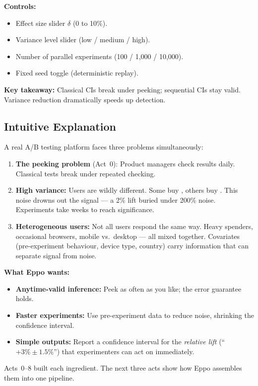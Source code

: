 \documentclass[12pt, a4paper]{article}
\begin{document}
\begin{simulation}
\textbf{Controls:}
\begin{itemize}[nosep]
  \item Effect size slider $\delta$ (0 to 10\%).
  \item Variance level slider (low / medium / high).
  \item Number of parallel experiments (100 / 1,000 / 10,000).
  \item Fixed seed toggle (deterministic replay).
\end{itemize}

\textbf{Key takeaway:}
Classical CIs break under peeking; sequential CIs stay valid.  Variance
reduction dramatically speeds up detection.
\end{simulation}

\subsection{Intuitive Explanation}

\begin{intuition}
A real A/B testing platform faces three problems simultaneously:

\begin{enumerate}
  \item \textbf{The peeking problem} (Act~0): Product managers check results
        daily.  Classical tests break under repeated checking.

  \item \textbf{High variance:} Users are wildly different.  Some buy
        , others buy .  This noise drowns out the
        signal --- a 2\% lift buried under 200\% noise.  Experiments take
        weeks to reach significance.

  \item \textbf{Heterogeneous users:} Not all users respond the same way.
        Heavy spenders, occasional browsers, mobile vs.\ desktop --- all
        mixed together.  Covariates (pre-experiment behaviour, device type,
        country) carry information that can separate signal from noise.
\end{enumerate}

\textbf{What Eppo wants:}
\begin{itemize}[nosep]
  \item \textbf{Anytime-valid inference:} Peek as often as you like;
        the error guarantee holds.
  \item \textbf{Faster experiments:} Use pre-experiment data to reduce noise,
        shrinking the confidence interval.
  \item \textbf{Simple outputs:} Report a confidence interval for the
        \emph{relative lift} (``$+3\% \pm 1.5\%$'') that experimenters can
        act on immediately.
\end{itemize}

Acts~0--8 built each ingredient.  The next three acts show how Eppo assembles
them into one pipeline.
\end{intuition}
\end{document}
